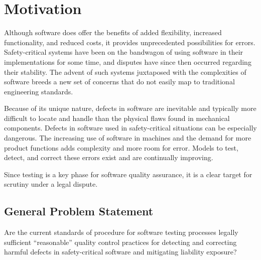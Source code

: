 \chapter{Motivation}

Although software does offer the benefits of added flexibility, increased
functionality, and reduced costs, it provides unprecedented possibilities for
errors. Safety-critical systems have been on the bandwagon of using software in
their implementations for some time, and disputes have since then occurred
regarding their stability. The advent of such systems juxtaposed with the
complexities of software breeds a new set of concerns that do not easily map to
traditional engineering standards.

Because of its unique nature, defects in software are inevitable and typically
more difficult to locate and handle than the physical flaws found in mechanical
components. Defects in software used in safety-critical situations can be
especially dangerous. The increasing use of software in machines and the demand
for more product functions adds complexity and more room for error. Models to
test, detect, and correct these errors exist and are continually improving.

Since testing is a key phase for software quality assurance, it is a clear
target for scrutiny under a legal dispute.

\section{General Problem Statement}
Are the current standards of procedure for software testing processes legally
sufficient ``reasonable'' quality control practices for detecting and correcting
harmful defects in safety-critical software and mitigating liability exposure?
